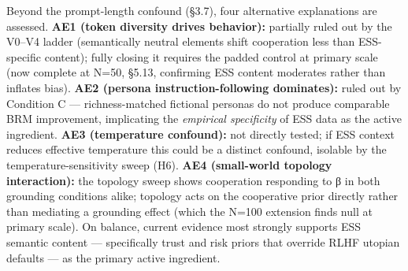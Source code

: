 
Beyond the prompt-length confound (§3.7), four alternative explanations are assessed. \textbf{AE1 (token diversity drives behavior):} partially ruled out by the V0–V4 ladder (semantically neutral elements shift cooperation less than ESS-specific content); fully closing it requires the padded control at primary scale (now complete at N=50, §5.13, confirming ESS content moderates rather than inflates bias). \textbf{AE2 (persona instruction-following dominates):} ruled out by Condition C — richness-matched fictional personas do not produce comparable BRM improvement, implicating the \textit{empirical specificity} of ESS data as the active ingredient. \textbf{AE3 (temperature confound):} not directly tested; if ESS context reduces effective temperature this could be a distinct confound, isolable by the temperature-sensitivity sweep (H6). \textbf{AE4 (small-world topology interaction):} the topology sweep shows cooperation responding to β in both grounding conditions alike; topology acts on the cooperative prior directly rather than mediating a grounding effect (which the N=100 extension finds null at primary scale). On balance, current evidence most strongly supports ESS semantic content — specifically trust and risk priors that override RLHF utopian defaults — as the primary active ingredient.

